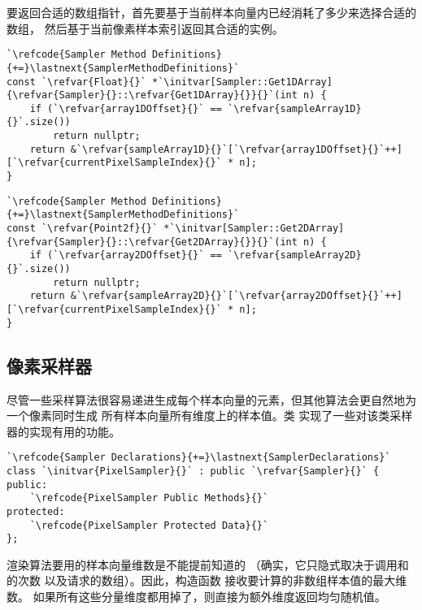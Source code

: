 要返回合适的数组指针，首先要基于当前样本向量内已经消耗了多少来选择合适的数组，
然后基于当前像素样本索引返回其合适的实例。
\begin{lstlisting}
`\refcode{Sampler Method Definitions}{+=}\lastnext{SamplerMethodDefinitions}`
const `\refvar{Float}{}` *`\initvar[Sampler::Get1DArray]{\refvar{Sampler}{}::\refvar{Get1DArray}{}}{}`(int n) {
    if (`\refvar{array1DOffset}{}` == `\refvar{sampleArray1D}{}`.size())
        return nullptr;
    return &`\refvar{sampleArray1D}{}`[`\refvar{array1DOffset}{}`++][`\refvar{currentPixelSampleIndex}{}` * n];
}
\end{lstlisting}
\begin{lstlisting}
`\refcode{Sampler Method Definitions}{+=}\lastnext{SamplerMethodDefinitions}`
const `\refvar{Point2f}{}` *`\initvar[Sampler::Get2DArray]{\refvar{Sampler}{}::\refvar{Get2DArray}{}}{}`(int n) {
    if (`\refvar{array2DOffset}{}` == `\refvar{sampleArray2D}{}`.size())
        return nullptr;
    return &`\refvar{sampleArray2D}{}`[`\refvar{array2DOffset}{}`++][`\refvar{currentPixelSampleIndex}{}` * n];
}
\end{lstlisting}

\subsection{像素采样器}\label{sub:像素采样器}
尽管一些采样算法很容易递进生成每个样本向量的元素，但其他算法会更自然地为一个像素同时生成
所有样本向量所有维度上的样本值。类
实现了一些对该类采样器的实现有用的功能。
\begin{lstlisting}
`\refcode{Sampler Declarations}{+=}\lastnext{SamplerDeclarations}`
class `\initvar{PixelSampler}{}` : public `\refvar{Sampler}{}` {
public:
    `\refcode{PixelSampler Public Methods}{}`
protected:
    `\refcode{PixelSampler Protected Data}{}`
};
\end{lstlisting}

渲染算法要用的样本向量维数是不能提前知道的
（确实，它只隐式取决于调用和的次数
以及请求的数组）。因此，构造函数
接收要计算的非数组样本值的最大维数。
如果所有这些分量维度都用掉了，则直接为额外维度返回均匀随机值。

